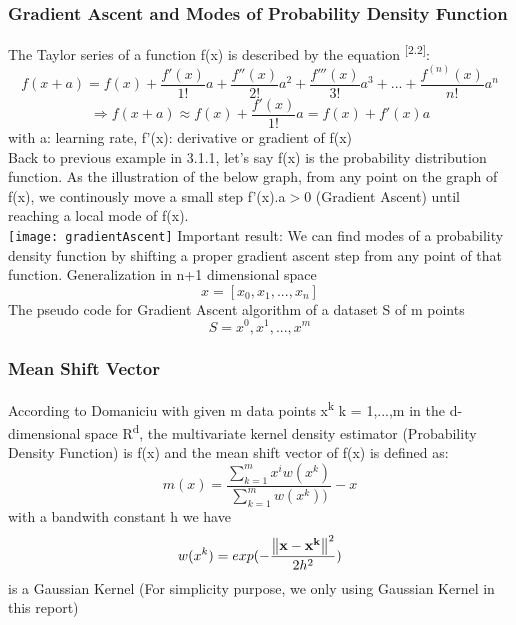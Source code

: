 \subsubsection{Gradient Ascent and Modes of Probability Density Function}
The Taylor series of a function f(x) is described by the equation \textsuperscript{[2.2]}:
\[
    f(x+a) = f(x) + \frac{f'(x)}{1!}a+\frac{f''(x)}{2!}a^2+\frac{f'''(x)}{3!}a^3+...+\frac{f^{(n)}(x)}{n!}a^n
\]
\[\Longrightarrow f(x+a) \approx f(x) + \frac{f'(x)}{1!}a =  f(x) + f'(x)a\]
with a: learning rate,  f'(x): derivative or gradient of f(x)\\
Back to previous example in 3.1.1, let's say f(x) is the probability distribution function. As the illustration of the below graph, from any point on the graph of f(x), we continously move a small step f'(x).a$>$0 (Gradient Ascent) until reaching a local mode of f(x).\\ 
\texttt{[image: gradientAscent]}
Important result: We can find modes of a probability density function by shifting a proper gradient ascent step from any point of that function. Generalization in n+1 dimensional space \[x=[x_0,x_1,...,x_n]\]
The pseudo code for Gradient Ascent algorithm of a dataset S of m points \[S = {x^0,x^1,...,x^m}\]

\subsubsection{Mean Shift Vector}

According to Domaniciu with given m data points x\textsuperscript{k} k = 1,...,m in the d-dimensional space R\textsuperscript{d}, the multivariate kernel density estimator (Probability Density Function) is f(x) and the mean shift vector of f(x) is defined as:
	\[m(x) = \frac{\sum_{k=1}^{m}x^i{w(x^k) }}{\sum_{k=1}^{m}{w(x^k) }) }-x\]
with a bandwith constant h we have \[w(x^k) = exp(-\frac{\norm{\vb{{x-x^k}}}^2}{2{h}^2})\] is a Gaussian Kernel (For simplicity purpose, we only using Gaussian Kernel in this report)
